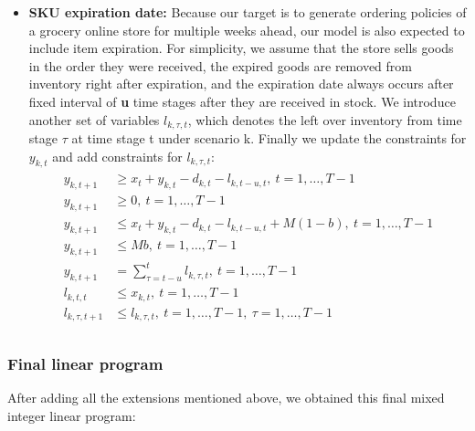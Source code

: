 \documentclass[11pt,a4paper]{article}
\begin{document}
\begin{itemize}
\item \textbf{SKU expiration date:}
Because our target is to generate ordering policies of a grocery online store for multiple weeks ahead, our model is also expected to include item expiration. For simplicity, we assume that the store sells goods in the order they were received, the expired goods are removed from inventory right after expiration, and the expiration date always occurs after fixed interval of \textbf{u} time stages after they are received in stock.
We introduce another set of variables $l_{k, \tau, t}$, which denotes the left over inventory from time stage $\tau$ at time stage t under scenario k. Finally we update the constraints for $y_{k,t}$ and add constraints for $l_{k, \tau, t}$:
\begin{equation}
\begin{gathered}
\begin{aligned}
 y_{k,t+1}\ &\geq x_t + y_{k,t} - d_{k,t} -l_{k, t-u, t},\  t = 1,\dots,T-1\\ 
  y_{k,t+1}\ &\geq 0,\  t = 1,\dots,T-1\\ 
   y_{k,t+1}\ &\leq x_t + y_{k,t} - d_{k,t} -l_{k, t-u, t} + M(1-b) ,\  t = 1,\dots,T-1\\  
   y_{k,t+1}\ &\leq Mb,\  t = 1,\dots,T-1\\ 
    y_{k,t+1}\ &= \sum\limits_{\tau=t-u}^{t}{ l_{k,\tau,t} },\  t = 1,\dots,T-1 \\
    l_{k,t,t} &\leq x_{k,t},\  t = 1,\dots,T-1 \\
    l_{k,\tau,t+1} &\leq l_{k,\tau,t},\  t = 1,\dots,T-1, \ \tau = 1, \dots, T-1 \\
 \end{aligned}
\end{gathered}
\end{equation}


\end{itemize}
\newpage
\subsubsection{Final linear program}
\label{sec:finallp}
After adding all the extensions mentioned above, we obtained this final mixed integer linear program: 
\end{document}
